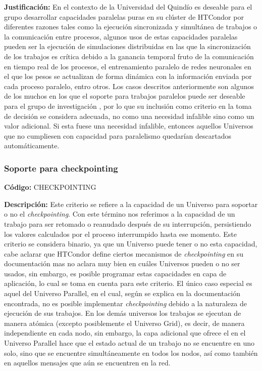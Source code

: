 \textbf{Justificación:} En el contexto de la Universidad del Quindío es deseable para el
grupo \GRID desarrollar capacidades paralelas puras en su clúster de HTCondor por
diferentes razones tales como la ejecución sincronizada y simultánea de trabajos o
la comunicación entre procesos, algunos usos de estas capacidades paralelas
pueden ser la ejecución de simulaciones distribuidas en las que la sincronización de
los trabajos es crítica debido a la ganancia temporal fruto de la comunicación en
tiempo real de los procesos, el entrenamiento paralelo de redes neuronales en el
que los pesos se actualizan de forma dinámica con la información enviada por cada
proceso paralelo, entro otros. Los casos descritos anteriormente son algunos de los
muchos en los que el soporte para trabajos paralelos puede ser deseable para el
grupo de investigación \GRID, por lo que su inclusión como criterio en la toma de
decisión se considera adecuada, no como una necesidad infalible sino como un
valor adicional. Si esta fuese una necesidad infalible, entonces aquellos Universos
que no cumpliesen con capacidad para paralelismo quedarían descartados
automáticamente.

\subsubsection{Soporte para checkpointing}
\textbf{Código:} CHECKPOINTING

\textbf{Descripción:} Este criterio se refiere a la capacidad de un Universo para soportar o
no el \textit{checkpointing}. Con este término nos referimos a la capacidad de un trabajo
para ser retomado o reanudado después de su interrupción, persistiendo los valores
calculados por el proceso interrumpido hasta ese momento. Este criterio se
considera binario, ya que un Universo puede tener o no esta capacidad, cabe aclarar
que HTCondor define ciertos mecanismos de \textit{checkpointing} en su documentación
mas no aclara muy bien en cuáles Universos pueden o no ser usados, sin embargo,
es posible programar estas capacidades en capa de aplicación, lo cual se toma en
cuenta para este criterio. El único caso especial es aquel del Universo Parallel, en
el cual, según se explica en la documentación encontrada, no es posible
implementar \textit{checkpointing} debido a la naturaleza de ejecución de sus trabajos. En
los demás universos los trabajos se ejecutan de manera atómica (excepto
posiblemente el Universo Grid), es decir, de manera independiente en cada nodo,
sin embargo, la capa adicional que ofrece el \MPI en el Universo Parallel hace que
el estado actual de un trabajo no se encuentre en uno solo, sino que se encuentre
simultáneamente en todos los nodos, así como también en aquellos mensajes que
aún se encuentren en la red.


